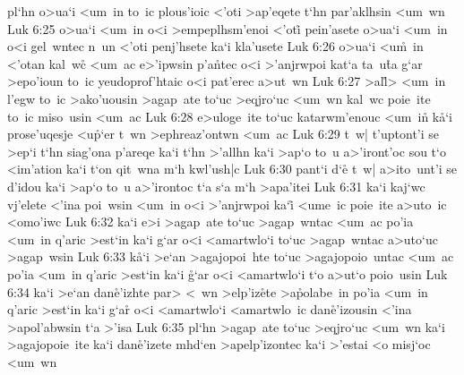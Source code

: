 pl`hn
o>ua`i
<um~in
to~ic
plous'ioic
<'oti
>ap'eqete
t`hn
par'aklhsin
<um~wn\bibvsend
\vs Luk 6:25
o>ua`i
<um~in
o<i
>empeplhsm'enoi
<'oti\r{}
pein'asete
o>ua`i
<um~in
o<i
gel~wntec
n~un
<'oti
penj'hsete
ka`i
kla'usete\bibvsend
\vs Luk 6:26
o>ua`i
<u\r{m}~in
<'otan
kal~wc\r{}
<um~ac
e>'ipwsin
p'a\r{n}tec
o<i
>'anjrwpoi
kat`a
ta~u\r{t}a
g`ar
>epo'ioun
to~ic
yeudoprof'htaic
o<i
pat'erec
a>ut~wn\bibvsend
\vs Luk 6:27
>al\r{l}>
<um~in
l'egw
to~ic
>ako'uousin
>agap~ate
to`uc
>eqjro`uc
<um~wn
kal~wc
poie~ite
to~ic
miso~usin
<um~ac\bibvsend
\vs Luk 6:28
e>uloge~ite
to`uc
katarwm'enouc
<um~i\r{n}
k\r{a}`i
prose'uqesje
<u\r{p}`er
t~wn
>ephreaz'ontwn
<um~ac\bibvsend
\vs Luk 6:29
t~w|
t'uptont'i
se
>ep`i
t`hn
siag'ona
p'areqe
ka`i
t`hn
>'allhn
ka`i
>ap`o
to~u
a>'iront'oc
sou
t`o
<im'ation
ka`i
t`on
qit~wna
m`h
kwl'ush|c\bibvsend
\vs Luk 6:30
pant`i
d`e\r{}
t~w|
a>ito~unt'i
se
d'idou
ka`i
>ap`o
to~u
a>'irontoc
t`a
s`a
m`h
>apa'itei\bibvsend
\vs Luk 6:31
ka`i
kaj`wc
vj'elete
<'ina
poi~wsin
<um~in
o<i
>'anjrwpoi
ka`i\r{}
<ume~ic
poie~ite
a>uto~ic
<omo'iwc\bibvsend
\vs Luk 6:32
ka`i
e>i
>agap~ate
to`uc
>agap~wntac
<um~ac
po'ia
<um~in
q'aric
>est`in
ka`i
g`ar
o<i
<amartwlo`i
to`uc
>agap~wntac
a>uto`uc
>agap~wsin\bibvsend
\vs Luk 6:33
k\r{a}`i
>e`an
>agajopoi~hte
to`uc
>agajopoio~untac
<um~ac
po'ia
<um~in
q'aric
>est`in
ka`i
\r{g}`ar
o<i
<amartwlo`i
t`o
a>ut`o
poio~usin\bibvsend
\vs Luk 6:34
ka`i
>e`an
dan\r{e}'izhte
par>
<~wn
>elp'iz\r{e}te
>a\r{p}olabe~in
po'ia
<um~in
q'aric
>est`in
ka`i
g`ar\r{}
o<i
<amartwlo`i
<amartwlo~ic
dan\r{e}'izousin
<'ina
>apol'abwsin
t`a
>'isa\bibvsend
\vs Luk 6:35
pl`hn
>agap~ate
to`uc
>eqjro`uc
<um~wn
ka`i
>agajopoie~ite
ka`i
dan\r{e}'izete
mhd`en
>apelp'izontec
ka`i
>'estai
<o
misj`oc
<um~wn
